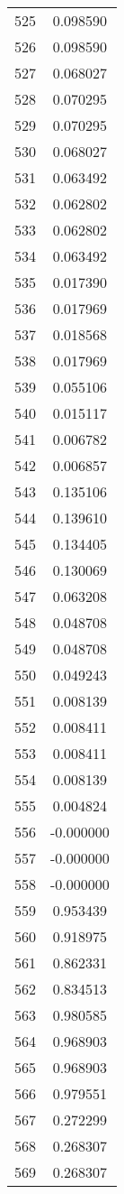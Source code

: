 \documentclass[12pt]{article}
\begin{document}
\begin{longtable}{@{}cc@{}}
525 & 0.098590 \\
526 & 0.098590 \\
527 & 0.068027 \\
528 & 0.070295 \\
529 & 0.070295 \\
530 & 0.068027 \\
531 & 0.063492 \\
532 & 0.062802 \\
533 & 0.062802 \\
534 & 0.063492 \\
535 & 0.017390 \\
536 & 0.017969 \\
537 & 0.018568 \\
538 & 0.017969 \\
539 & 0.055106 \\
540 & 0.015117 \\
541 & 0.006782 \\
542 & 0.006857 \\
543 & 0.135106 \\
544 & 0.139610 \\
545 & 0.134405 \\
546 & 0.130069 \\
547 & 0.063208 \\
548 & 0.048708 \\
549 & 0.048708 \\
550 & 0.049243 \\
551 & 0.008139 \\
552 & 0.008411 \\
553 & 0.008411 \\
554 & 0.008139 \\
555 & 0.004824 \\
556 & -0.000000 \\
557 & -0.000000 \\
558 & -0.000000 \\
559 & 0.953439 \\
560 & 0.918975 \\
561 & 0.862331 \\
562 & 0.834513 \\
563 & 0.980585 \\
564 & 0.968903 \\
565 & 0.968903 \\
566 & 0.979551 \\
567 & 0.272299 \\
568 & 0.268307 \\
569 & 0.268307 \\

\end{longtable}
\end{document}
